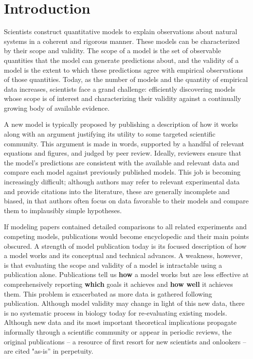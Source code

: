 \documentclass[11pt,letterpaper]{article}
\begin{document}
\section{Introduction}
Scientists construct quantitative models to explain observations about natural systems in a coherent and rigorous manner. These models can be characterized by their scope and validity. The scope of a model is the set of observable quantities that the model can generate predictions about, and the validity of a model is the extent to which these predictions agree with empirical observations of those quantities. Today, as the number of models and the quantity of empirical data increases, scientists face a grand challenge: efficiently discovering models whose scope is of interest and characterizing their validity against a continually growing body of available evidence. 

A new model is typically proposed by publishing a description of how it works along with an argument justifying its utility to some targeted scientific community. This argument is made in words, supported by a handful of relevant equations and figures, and judged by peer review. Ideally, reviewers ensure that the model's predictions are consistent with the available and relevant data and compare each model against previously published models. This job is becoming increasingly difficult; although authors may refer to relevant experimental data and provide citations into the literature, these are generally incomplete and biased, in that authors often focus on data favorable to their models and compare them to implausibly simple hypotheses.

If modeling papers contained detailed comparisons to all related experiments and competing models, publications would become encyclopedic and their main points obscured. A strength of model publication today is its focused description of how a model works and its conceptual and technical advances. A weakness, however, is that evaluating the scope and validity of a model is intractable using a publication alone. Publications tell us \textbf{how} a model works but are less effective at comprehensively reporting \textbf{which} goals it achieves and \textbf{how well} it achieves them. This problem is exacerbated as more data is gathered following publication. Although model validity may change in light of this new data, there is no systematic process in biology today for re-evaluating existing models. Although new data and its most important theoretical implications propagate informally through a scientific community or appear in periodic reviews, the original publications -- a resource of first resort for new scientists and onlookers -- are cited "as-is'' in perpetuity. 	
\end{document}
